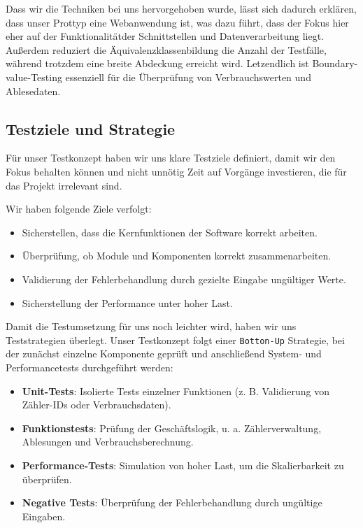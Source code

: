 Dass wir die Techniken bei uns hervorgehoben wurde, lässt sich dadurch erklären, dass unser Prottyp eine Webanwendung ist,  was dazu führt, dass der Fokus hier eher auf der
Funktionalitätder Schnittstellen und Datenverarbeitung liegt. Außerdem reduziert die Äquivalenzklassenbildung die Anzahl der Testfälle, während trotzdem eine breite Abdeckung erreicht wird.
Letzendlich ist Boundary-value-Testing essenziell für die Überprüfung von Verbrauchswerten und Ablesedaten.\par

\subsection{Testziele und Strategie}

Für unser Testkonzept haben wir uns klare Testziele definiert, damit wir den Fokus behalten können und nicht unnötig Zeit auf Vorgänge investieren, die für das Projekt irrelevant sind.\par
Wir haben folgende Ziele verfolgt:
\begin{itemize}
	\item Sicherstellen, dass die Kernfunktionen der Software korrekt arbeiten.
	\item Überprüfung, ob Module und Komponenten korrekt zusammenarbeiten.
	\item Validierung der Fehlerbehandlung durch gezielte Eingabe ungültiger Werte.
	\item Sicherstellung der Performance unter hoher Last.
\end{itemize}

Damit die Testumsetzung für uns noch leichter wird, haben wir uns Teststrategien überlegt.
Unser Testkonzept folgt einer \texttt{Botton-Up} Strategie, bei der zunächst einzelne Komponente geprüft und anschließend System- und Performancetests durchgeführt werden:\par
\begin{itemize}
	\item \textbf{Unit-Tests}: Isolierte Tests einzelner Funktionen (z. B. Validierung von Zähler-IDs oder Verbrauchsdaten).
	\item \textbf{Funktionstests}: Prüfung der Geschäftslogik, u. a. Zählerverwaltung, Ablesungen und Verbrauchsberechnung.
	\item \textbf{Performance-Tests}: Simulation von hoher Last, um die Skalierbarkeit zu überprüfen.
	\item \textbf{Negative Tests}: Überprüfung der Fehlerbehandlung durch ungültige Eingaben.
\end{itemize}


